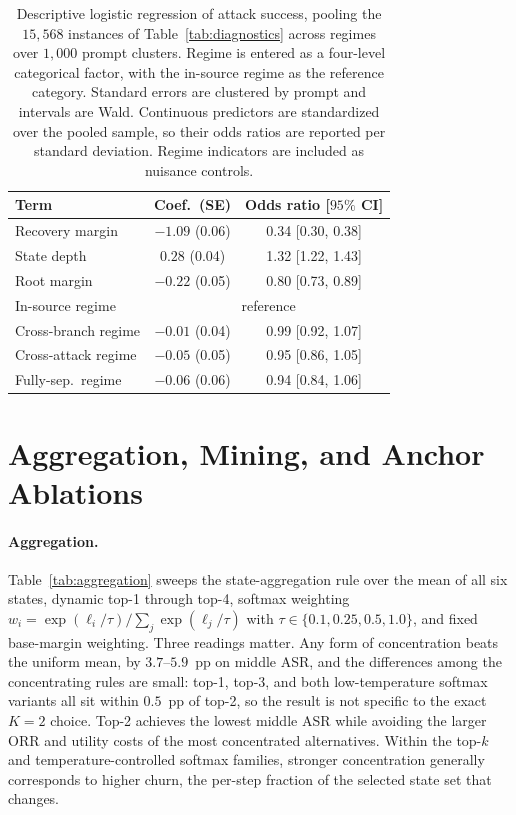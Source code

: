 \documentclass[11pt]{article}
\newcommand{\asr}{ASR}
\begin{document}
\begin{table}[t]
  \centering
  \scriptsize
  \setlength{\tabcolsep}{3.5pt}
  \begin{tabular}{lcc}
    \toprule
    Term & Coef.\ (SE) & Odds ratio [\(95\%\) CI] \\
    \midrule
    Recovery margin      & \(-1.09\) (0.06) & 0.34 [0.30, 0.38] \\
    State depth          & \(0.28\) (0.04)  & 1.32 [1.22, 1.43] \\
    Root margin          & \(-0.22\) (0.05) & 0.80 [0.73, 0.89] \\
    \midrule
    In-source regime     & \multicolumn{2}{c}{reference} \\
    Cross-branch regime  & \(-0.01\) (0.04) & 0.99 [0.92, 1.07] \\
    Cross-attack regime  & \(-0.05\) (0.05) & 0.95 [0.86, 1.05] \\
    Fully-sep.\ regime   & \(-0.06\) (0.06) & 0.94 [0.84, 1.06] \\
    \bottomrule
  \end{tabular}
  \caption{Descriptive logistic regression of attack success, pooling the
  \(15{,}568\) instances of Table~\ref{tab:diagnostics} across regimes over
  \(1{,}000\) prompt clusters. Regime is entered as a four-level categorical
  factor, with the in-source regime as the reference category. Standard errors
  are clustered by prompt and intervals are Wald. Continuous predictors are
  standardized over the pooled sample, so their odds ratios are reported per
  standard deviation. Regime indicators are included as nuisance controls.}
  \label{tab:logit}
\end{table}

\section{Aggregation, Mining, and Anchor Ablations}
\label{app:ablations}

\paragraph{Aggregation.}
Table~\ref{tab:aggregation} sweeps the state-aggregation rule over the mean of
all six states, dynamic top-1 through top-4, softmax weighting
\(w_i=\exp(\ell_i/\tau)/\sum_j \exp(\ell_j/\tau)\) with
\(\tau\in\{0.1,0.25,0.5,1.0\}\), and fixed base-margin weighting. Three
readings matter. Any form of concentration beats the uniform mean, by
\(3.7\)--\(5.9\)~pp on middle \asr{}, and the differences among the
concentrating rules are small: top-1, top-3, and both low-temperature softmax
variants all sit within \(0.5\)~pp of top-2, so the result is not specific to
the exact \(K=2\) choice. Top-2 achieves the lowest middle \asr{} while avoiding
the larger ORR and utility costs of the most concentrated alternatives. Within
the top-\(k\) and temperature-controlled softmax families, stronger
concentration generally corresponds to higher churn, the per-step fraction of
the selected state set that changes.
\end{document}

